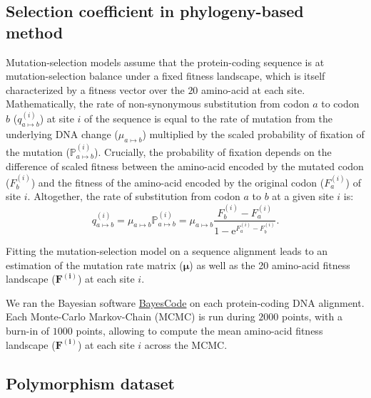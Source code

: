\documentclass{article}
\newcommand{\UniDimArray}[1]{\bm{#1}}
\newcommand{\e}{\mathrm{e}}
\newcommand{\proba}{\mathbb{P}}
\begin{document}
    \subsection{Selection coefficient in phylogeny-based method}
    Mutation-selection models assume that the protein-coding sequence is at mutation-selection balance under a fixed fitness landscape, which is itself characterized by a fitness vector over the $20$ amino-acid at each site\cite{yang_mutationselection_2008, halpern_evolutionary_1998, rodrigue_mechanistic_2010}.
    Mathematically, the rate of non-synonymous substitution from codon $a$ to codon $b$ ($q_{a \mapsto b}^{(i)}$) at site $i$ of the sequence is equal to the rate of mutation from the underlying DNA change ($\mu_{a \mapsto b}$) multiplied by the scaled probability of fixation of the mutation ($\proba_{a \mapsto b}^{(i)}$).
    Crucially, the probability of fixation depends on the difference of scaled fitness between the amino-acid encoded by the mutated codon ($F_b^{(i)}$) and the fitness of the amino-acid encoded by the original codon ($F_a^{(i)}$) of site $i$\cite{wright_evolution_1931, fisher_genetical_1930}.
    Altogether, the rate of substitution from codon $a$ to $b$ at a given site $i$ is:
    \begin{equation}
        q_{a \mapsto b}^{(i)} = \mu_{a \mapsto b} \proba_{a \mapsto b}^{(i)} = \mu_{a \mapsto b} \dfrac{F_b^{(i)} - F_a^{(i)}}{1 - \e^{F_a^{(i)} - F_b^{(i)}}}.
    \end{equation}

    Fitting the mutation-selection model on a sequence alignment leads to an estimation of the mutation rate matrix ($\UniDimArray{\mu}$) as well as the 20 amino-acid fitness landscape ($\UniDimArray{F^{(i)}}$) at each site $i$.

    We ran the Bayesian software \href{https://github.com/bayesiancook/bayescode}{BayesCode} on each protein-coding DNA alignment\cite{lartillot_phylobayes_2013, rodrigue_detecting_2017}.
    Each Monte-Carlo Markov-Chain (MCMC) is run during $2000$ points, with a burn-in of $1000$ points, allowing to compute the mean amino-acid fitness landscape ($\UniDimArray{F^{(i)}}$) at each site $i$ across the MCMC.

    \subsection{Polymorphism dataset}
\end{document}
